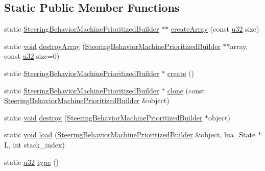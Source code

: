 \subsection*{Static Public Member Functions}
\begin{DoxyCompactItemize}
\item 
static \mbox{\hyperlink{classnjli_1_1_steering_behavior_machine_prioritized_builder}{Steering\+Behavior\+Machine\+Prioritized\+Builder}} $\ast$$\ast$ \mbox{\hyperlink{classnjli_1_1_steering_behavior_machine_prioritized_builder_ad4cf91f79d4584cabf80a94ce5577eec}{create\+Array}} (const \mbox{\hyperlink{_util_8h_a10e94b422ef0c20dcdec20d31a1f5049}{u32}} size)
\item 
static \mbox{\hyperlink{_thread_8h_af1e856da2e658414cb2456cb6f7ebc66}{void}} \mbox{\hyperlink{classnjli_1_1_steering_behavior_machine_prioritized_builder_af2ed77dcd5f7ce585d1d82b8c5d75c46}{destroy\+Array}} (\mbox{\hyperlink{classnjli_1_1_steering_behavior_machine_prioritized_builder}{Steering\+Behavior\+Machine\+Prioritized\+Builder}} $\ast$$\ast$array, const \mbox{\hyperlink{_util_8h_a10e94b422ef0c20dcdec20d31a1f5049}{u32}} size=0)
\item 
static \mbox{\hyperlink{classnjli_1_1_steering_behavior_machine_prioritized_builder}{Steering\+Behavior\+Machine\+Prioritized\+Builder}} $\ast$ \mbox{\hyperlink{classnjli_1_1_steering_behavior_machine_prioritized_builder_aecab02d27de311aea38bebc4f35ebea1}{create}} ()
\item 
static \mbox{\hyperlink{classnjli_1_1_steering_behavior_machine_prioritized_builder}{Steering\+Behavior\+Machine\+Prioritized\+Builder}} $\ast$ \mbox{\hyperlink{classnjli_1_1_steering_behavior_machine_prioritized_builder_a4d7150d424e3dd59787eefcd1e173b84}{clone}} (const \mbox{\hyperlink{classnjli_1_1_steering_behavior_machine_prioritized_builder}{Steering\+Behavior\+Machine\+Prioritized\+Builder}} \&object)
\item 
static \mbox{\hyperlink{_thread_8h_af1e856da2e658414cb2456cb6f7ebc66}{void}} \mbox{\hyperlink{classnjli_1_1_steering_behavior_machine_prioritized_builder_a421191e002bd0e57fb5db748dc0b9f19}{destroy}} (\mbox{\hyperlink{classnjli_1_1_steering_behavior_machine_prioritized_builder}{Steering\+Behavior\+Machine\+Prioritized\+Builder}} $\ast$object)
\item 
static \mbox{\hyperlink{_thread_8h_af1e856da2e658414cb2456cb6f7ebc66}{void}} \mbox{\hyperlink{classnjli_1_1_steering_behavior_machine_prioritized_builder_a2673c76594a6d5678564c5f53e061902}{load}} (\mbox{\hyperlink{classnjli_1_1_steering_behavior_machine_prioritized_builder}{Steering\+Behavior\+Machine\+Prioritized\+Builder}} \&object, lua\+\_\+\+State $\ast$L, int stack\+\_\+index)
\item 
static \mbox{\hyperlink{_util_8h_a10e94b422ef0c20dcdec20d31a1f5049}{u32}} \mbox{\hyperlink{classnjli_1_1_steering_behavior_machine_prioritized_builder_a9338ef234a4a9529a53e496e955eff6f}{type}} ()
\end{DoxyCompactItemize}
